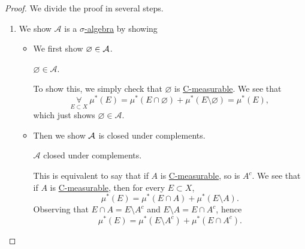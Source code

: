 \begin{proof}\let\qed\relax
	We divide the proof in several steps.
	\begin{enumerate}[(1)]
		\item We show \(\mathcal{A}\) is a \hyperref[def:sigma-algebra]{\(\sigma\)-algebra} by showing
		      \begin{itemize}
			      \item We first show \(\varnothing \in \mathcal{\MakeUppercase{a}} \).
			            \begin{claim}
				            \(\varnothing \in \mathcal{A} \).
			            \end{claim}
			            \begin{explanation}
				            To show this, we simply check that \(\varnothing \) is \hyperref[def:C-measurable]{C-measurable}. We see that
				            \[
					            \underset{E\subset X}{\forall}\ \mu^{*} (E) = \mu^{*} (E\cap \varnothing ) + \mu^{*} (E \setminus \varnothing ) = \mu^{*} (E),
				            \]
				            which just shows \(\varnothing \in \mathcal{A}\).
			            \end{explanation}
			      \item Then we show \(\mathcal{\MakeUppercase{a}} \) is closed under complements.
			            \begin{claim}
				            \(\mathcal{A} \) closed under complements.
			            \end{claim}
			            \begin{explanation}
				            This is equivalent to say that if \(A\) is \hyperref[def:C-measurable]{C-measurable}, so is \(A^{c}\).
				            We see that if \(A\) is \hyperref[def:C-measurable]{C-measurable}, then for every \(E\subset X\),
				            \[
					            \mu^{*} (E) = \mu^{*} (E\cap A) + \mu^{*} (E\setminus A).
				            \]
				            Observing that \(E\cap A = E\setminus A^{c} \) and \(E\setminus A = E\cap A^{c} \), hence
				            \[
					            \mu^{*} (E) = \mu^{*} (E\setminus A^{c} ) + \mu^{*} (E\cap A^{c} ).
				            \]


\end{explanation}
\end{itemize}
\end{enumerate}
\end{proof}
